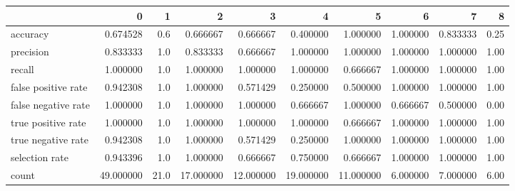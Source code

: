 \begin{tabular}{lrrrrrrrrr}
\toprule
{} &          0 &     1 &          2 &          3 &          4 &          5 &         6 &         7 &     8 \\
\midrule
accuracy            &   0.674528 &   0.6 &   0.666667 &   0.666667 &   0.400000 &   1.000000 &  1.000000 &  0.833333 &  0.25 \\
precision           &   0.833333 &   1.0 &   0.833333 &   0.666667 &   1.000000 &   1.000000 &  1.000000 &  1.000000 &  1.00 \\
recall              &   1.000000 &   1.0 &   1.000000 &   1.000000 &   1.000000 &   0.666667 &  1.000000 &  1.000000 &  1.00 \\
false positive rate &   0.942308 &   1.0 &   1.000000 &   0.571429 &   0.250000 &   0.500000 &  1.000000 &  1.000000 &  1.00 \\
false negative rate &   1.000000 &   1.0 &   1.000000 &   1.000000 &   0.666667 &   1.000000 &  0.666667 &  0.500000 &  0.00 \\
true positive rate  &   1.000000 &   1.0 &   1.000000 &   1.000000 &   1.000000 &   0.666667 &  1.000000 &  1.000000 &  1.00 \\
true negative rate  &   0.942308 &   1.0 &   1.000000 &   0.571429 &   0.250000 &   1.000000 &  1.000000 &  1.000000 &  1.00 \\
selection rate      &   0.943396 &   1.0 &   1.000000 &   0.666667 &   0.750000 &   0.666667 &  1.000000 &  1.000000 &  1.00 \\
count               &  49.000000 &  21.0 &  17.000000 &  12.000000 &  19.000000 &  11.000000 &  6.000000 &  7.000000 &  6.00 \\
\bottomrule
\end{tabular}
